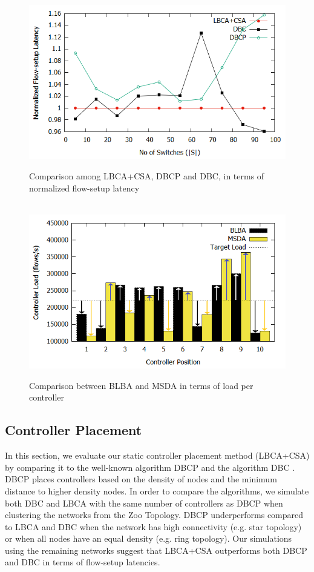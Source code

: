 \documentclass[final,5p,times]{cas-dc}
\begin{document}
	\begin{figure}[t]
		\centering
		\includegraphics[width=\linewidth]{Images/forced_comparison.png}
		\caption{Comparison among LBCA+CSA, DBCP and DBC, in terms of normalized flow-setup latency} \label{fig:Fcomparison}
		~
		\centering
		\includegraphics[width=\linewidth]{Images/load_comparison_edit.png}
		\caption{Comparison between BLBA and MSDA in terms of load per controller} \label{fig:Lcomparison}
	\end{figure}

	\subsection{Controller Placement} \label{CPAnalysis}
	
	In this section, we evaluate our static controller placement method (LBCA+CSA) by comparing it to the well-known algorithm DBCP \cite{dbcp2017} and the algorithm DBC \cite{aziz2019degree}. DBCP places controllers based on the density of nodes and the minimum distance to higher density nodes. In order to compare the algorithms, we simulate both DBC and LBCA with the same number of controllers as DBCP when clustering the networks from the Zoo Topology. DBCP underperforms compared to LBCA and DBC when the network has high connectivity (e.g. star topology) or when all nodes have an equal density (e.g. ring topology). Our simulations using the remaining networks suggest that LBCA+CSA outperforms both DBCP and DBC in terms of flow-setup latencies.
	
\end{document}
